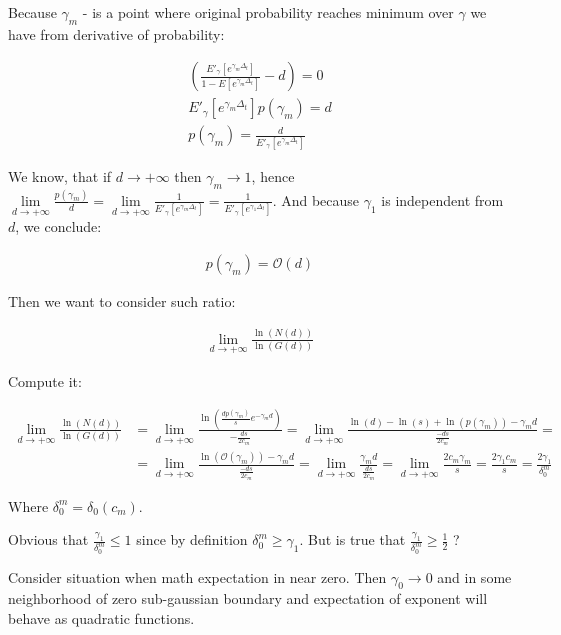 \documentclass[12pt, a4paper]{article}
\theoremstyle{remark}
\theoremstyle{definition}
\newcommand{\limd}{\lim\limits_{d \to +\infty}}
\begin{document}
Because \(\gamma_m\) - is a point where original probability reaches minimum over \(\gamma\) we have from derivative of probability:

\begin{gather*}
    \left(\frac{E'_\gamma [e^{\gamma_m \Delta_t}]}{1 - E[e^{\gamma_m \Delta_t}]} - d\right) = 0 \\
    E'_\gamma [e^{\gamma_m \Delta_t}] p(\gamma_m) = d \\
    p(\gamma_m) = \frac{d}{E'_\gamma [e^{\gamma_m \Delta_t}]}
\end{gather*}

We know, that if \(d \to +\infty\) then \(\gamma_m \to 1\), hence \(\lim\limits_{d \to +\infty} \frac{p(\gamma_m)}{d} = \lim\limits_{d \to +\infty} \frac{1}{E'_\gamma [e^{\gamma_m \Delta_t}]} = \frac{1}{E'_\gamma [e^{\gamma_1 \Delta_t}]} \). And because \(\gamma_1\) is independent from \(d\), we conclude:

\begin{align*}
    p(\gamma_m) = \mathcal{O} (d)
\end{align*}

Then we want to consider such ratio:

\begin{align*}
    \limd \frac{\ln(N(d))}{\ln(G(d))}
\end{align*}

Compute it:

\begin{align*}
    \limd \frac{\ln(N(d))}{\ln(G(d))} &= \limd \frac{\ln(\frac{d p(\gamma_m)}{s}  e^{-\gamma_m d})}{-\frac{d s}{2 c_m}} = \limd \frac{\ln(d) - \ln(s) + \ln(p(\gamma_m)) - \gamma_m d}{\frac{- d s}{2 c_m}} = \\
    &= \limd \frac{\ln(\mathcal{O}(\gamma_m)) - \gamma_m d}{\frac{- d s}{2 c_m}} = \limd \frac{\gamma_m d}{\frac{d s}{2 c_m}} = \limd \frac{2 c_m \gamma_m}{s} = \frac{2 \gamma_1 c_m}{s} = \frac{2 \gamma_1}{\delta_0^m}
\end{align*}

Where \(\delta_0^m = \delta_0(c_m)\).

Obvious that \(\frac{\gamma_1}{\delta_0^m} \leq 1\) since by definition \(\delta_0^m \geq \gamma_1\). But is true that \(\frac{\gamma_1}{\delta_0^m} \geq \frac{1}{2}\) ?

Consider situation when math expectation in near zero. Then \(\gamma_0 \to 0\) and in some neighborhood of zero sub-gaussian boundary and expectation of exponent will behave as quadratic functions.
\end{document}
